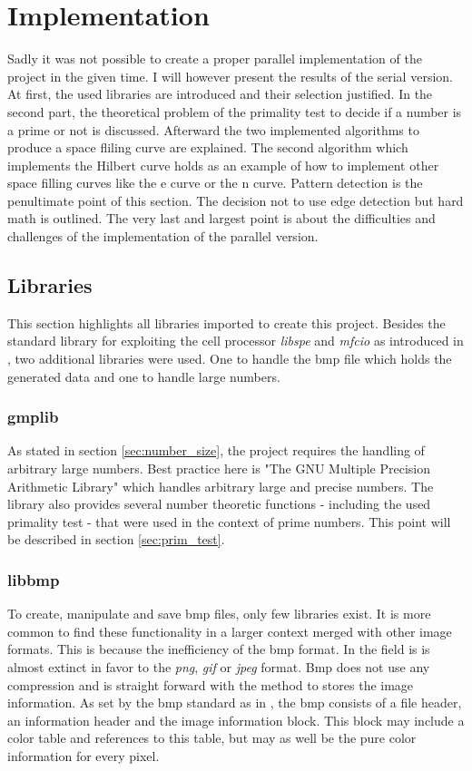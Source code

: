 \section{Implementation}
\label{sec:implementation}
Sadly it was not possible to create a proper parallel implementation of the project in the given time. I will however present the results of the serial version.
At first, the used libraries are introduced and their selection justified.
In the second part, the theoretical problem of the primality test to decide if a number is a prime or not is discussed. Afterward the two implemented algorithms to produce a space fliling curve are explained. The second algorithm which implements the Hilbert curve holds as an example of how to implement other space filling curves like the e curve or the n curve. Pattern detection is the penultimate point of this section. The decision not to use edge detection but hard math is outlined. The very last and largest point is about the difficulties and challenges of the implementation of the parallel version.

\subsection{Libraries}
\label{sec:libs}
This section highlights all libraries imported to create this project. Besides the standard library for exploiting the cell processor \emph{libspe} and \emph{mfcio} as introduced in \cite{cellguide}, two additional libraries were used. One to handle the bmp file which holds the generated data and one to handle large numbers.

\subsubsection{gmplib}
As stated in section \ref{sec:number_size}, the project requires the handling of arbitrary large numbers. Best practice here is "The GNU Multiple Precision Arithmetic Library" which handles arbitrary large and precise numbers. The library also provides several number theoretic functions - including the used primality test - that were used in the context of prime numbers. This point will be described in section \ref{sec:prim_test}.

\subsubsection{libbmp}
To create, manipulate and save bmp files, only few libraries exist. It is more common to find these functionality in a larger context merged with other image formats. This is because the inefficiency of the bmp format. In the field is is almost extinct in favor to the \emph{png}, \emph{gif} or \emph{jpeg} format. Bmp does not use any compression and is straight forward with the method to stores the image information. As set by the bmp standard as in \cite{bmp}, the bmp consists of a file header, an information header and the image information block. This block may include a color table and references to this table, but may as well be the pure color information for every pixel.

